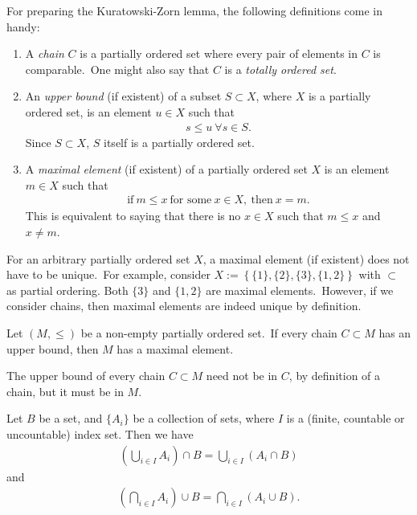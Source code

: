 \begin{defn}
	For preparing the Kuratowski-Zorn lemma, the following definitions come in handy: 
	\begin{enumerate}[label=\alph*)]
		\item A \textit{chain} $C$ is a partially ordered set where every pair of elements in $C$ is comparable.\ One might also say that $C$ is a \textit{totally ordered set}. 
		\item An \textit{upper bound} (if existent)  of a subset $S\subset X$, where $X$ is a partially ordered set, is an element $u\in X$ such that 
		\begin{align}
			s \leq u \ \forall s\in S. 
		\end{align}
		Since $S\subset X$, $S$ itself is a partially ordered set. 
		\item A \textit{maximal element} (if existent) of a partially ordered set $X$ is an element $m\in X$ such that 
		\begin{align}
			\text{if}\ m\leq x \ \text{for some}\ x\in X,\ \text{then}\ x=m.
		\end{align}
		This is equivalent to saying that there is no $x\in X$ such that $m\leq x$ and $x\ne m$. 
	\end{enumerate}
\end{defn}

\begin{remark}
	For an arbitrary partially ordered set $X$, a maximal element (if existent) does not have to be unique.\ For example, consider $X := \left\{ \{1\}, \{2\}, \{3\}, \{1, 2\} \right\}$ with $\subset$ as partial ordering. Both $\{3\}$ and $\{1, 2\}$ are maximal elements.\ However, if we consider chains, then maximal elements are indeed unique by definition. 
\end{remark}

\begin{theorem}
	Let $\left(M, \leq\right)$ be a non-empty partially ordered set.\ If every chain $C\subset M$ has an upper bound, then $M$ has a maximal element. 
\end{theorem}

\begin{remark}
	The upper bound of every chain $C\subset M$ need not be in $C$, by definition of a chain, but it must be in $M$. 
\end{remark}

\begin{theorem}
	Let $B$ be a set, and $\{A_i\}$ be a collection of sets, where $I$ is a (finite, countable or uncountable) index set. Then we have
	\begin{align}\label{eq:dist_law_set_ops}
		\left(\bigcup_{i\in I} A_i\right) \cap B = \bigcup_{i\in I}(A_i \cap B)
	\end{align}
	and 
	\begin{align}\label{eq:dist_law_set_ops_2}
		\left(\bigcap_{i\in I}A_i\right) \cup B = \bigcap_{i\in I}(A_i \cup B).
	\end{align}
\end{theorem}

